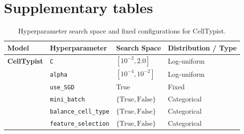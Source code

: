 \documentclass[11pt]{article}
\begin{document}
\clearpage

\section{Supplementary tables}\label{appendic:tables}

\begin{table}[htbp]
\centering
\caption{Hyperparameter search space and fixed configurations for CellTypist.}\label{tab:celltypist-hyperparameter-search-space}
\begin{tabular}{llll}
\toprule
\textbf{Model} & \textbf{Hyperparameter} & \textbf{Search Space} & \textbf{Distribution / Type} \\
\midrule
\textbf{CellTypist} & \texttt{C} & $[10^{-2}, 2.0]$ & Log-uniform \\
 & \texttt{alpha} & $[10^{-4}, 10^{-2}]$ & Log-uniform \\
 & \texttt{use\_SGD} & True & Fixed \\
 & \texttt{mini\_batch} & $\{\text{True}, \text{False}\}$ & Categorical \\
 & \texttt{balance\_cell\_type} & $\{\text{True}, \text{False}\}$ & Categorical \\
 & \texttt{feature\_selection} & $\{\text{True}, \text{False}\}$ & Categorical \\
\bottomrule
\end{tabular}
\end{table}
\end{document}
